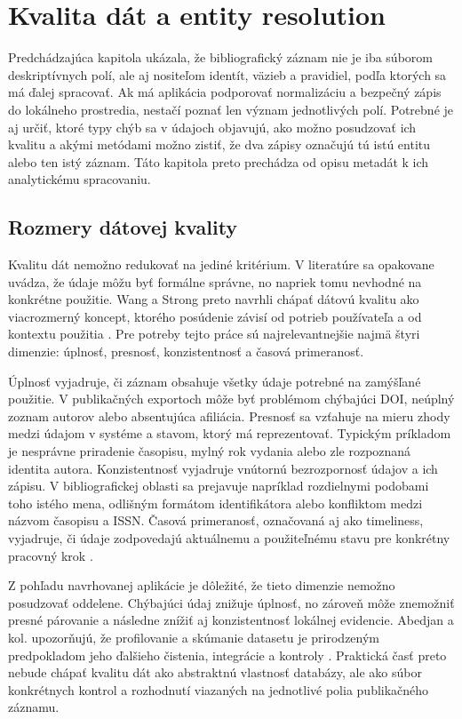 

\section{Kvalita dát a entity resolution}

Predchádzajúca kapitola ukázala, že bibliografický záznam nie je iba súborom deskriptívnych polí, ale aj nositeľom identít, väzieb a pravidiel, podľa ktorých sa má ďalej spracovať. Ak má aplikácia podporovať normalizáciu a bezpečný zápis do lokálneho prostredia, nestačí poznať len význam jednotlivých polí. Potrebné je aj určiť, ktoré typy chýb sa v údajoch objavujú, ako možno posudzovať ich kvalitu a akými metódami možno zistiť, že dva zápisy označujú tú istú entitu alebo ten istý záznam. Táto kapitola preto prechádza od opisu metadát k ich analytickému spracovaniu.

\subsection{Rozmery dátovej kvality}

Kvalitu dát nemožno redukovať na jediné kritérium. V literatúre sa opakovane uvádza, že údaje môžu byť formálne správne, no napriek tomu nevhodné na konkrétne použitie. Wang a Strong preto navrhli chápať dátovú kvalitu ako viacrozmerný koncept, ktorého posúdenie závisí od potrieb používateľa a od kontextu použitia \cite{WangStrong1996}. Pre potreby tejto práce sú najrelevantnejšie najmä štyri dimenzie: úplnosť, presnosť, konzistentnosť a časová primeranosť.

Úplnosť vyjadruje, či záznam obsahuje všetky údaje potrebné na zamýšľané použitie. V publikačných exportoch môže byť problémom chýbajúci DOI, neúplný zoznam autorov alebo absentujúca afiliácia. Presnosť sa vzťahuje na mieru zhody medzi údajom v systéme a stavom, ktorý má reprezentovať. Typickým príkladom je nesprávne priradenie časopisu, mylný rok vydania alebo zle rozpoznaná identita autora. Konzistentnosť vyjadruje vnútornú bezrozpornosť údajov a ich zápisu. V bibliografickej oblasti sa prejavuje napríklad rozdielnymi podobami toho istého mena, odlišným formátom identifikátora alebo konfliktom medzi názvom časopisu a ISSN. Časová primeranosť, označovaná aj ako timeliness, vyjadruje, či údaje zodpovedajú aktuálnemu a použiteľnému stavu pre konkrétny pracovný krok \cite{WangStrong1996,PipinoLeeWang2002}.

Z pohľadu navrhovanej aplikácie je dôležité, že tieto dimenzie nemožno posudzovať oddelene. Chýbajúci údaj znižuje úplnosť, no zároveň môže znemožniť presné párovanie a následne znížiť aj konzistentnosť lokálnej evidencie. Abedjan a kol. upozorňujú, že profilovanie a skúmanie datasetu je prirodzeným predpokladom jeho ďalšieho čistenia, integrácie a kontroly \cite{Abedjan2019}. Praktická časť preto nebude chápať kvalitu dát ako abstraktnú vlastnosť databázy, ale ako súbor konkrétnych kontrol a rozhodnutí viazaných na jednotlivé polia publikačného záznamu.

